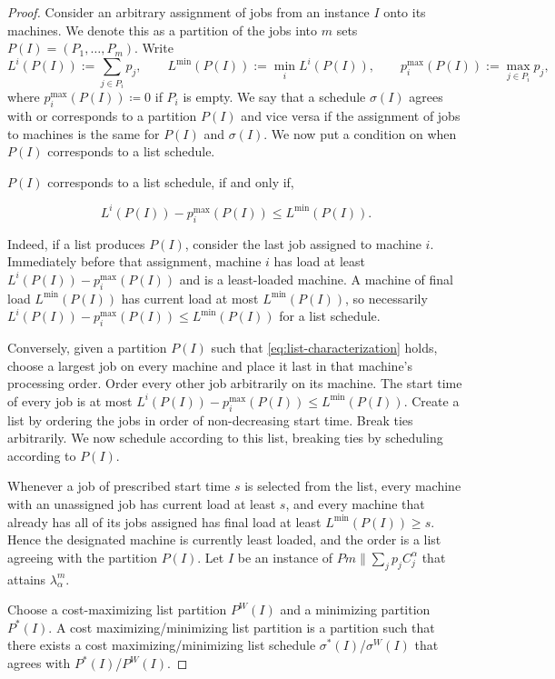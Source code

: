 \documentclass[%
english, titlepage=false %
]{./tum-templates/book/tumbook}
\begin{document}
\begin{proof}
Consider an arbitrary assignment of jobs from an instance $I$ onto its machines. We denote this as a partition of the jobs into $m$
sets $P(I)=(P_1,\ldots,P_m)$.
Write
\[
    L^{i}(P(I)):=\sum_{j\in P_i}p_j,
 \qquad L^{\min}(P(I)):=\min_i L^i(P(I)),
 \qquad p^{\max}_i(P(I)):=\max_{j\in P_i}p_j,
\]
where $p^{\max}_i(P(I)) \coloneqq 0$ if $P_i$ is empty. 
We say that a schedule $\sigma(I)$ agrees with or corresponds to a partition $P(I)$ and vice versa if the assignment of jobs to machines is the same for $P(I)$ and $\sigma(I)$.
We now put a condition on when $P(I)$ corresponds to a list schedule.

$P(I)$ corresponds to a list schedule, if and only if, 

\begin{equation}
    L^{i}(P(I))-p^{\max}_i(P(I)) \le L^{\min}(P(I)).
    \label{eq:list-characterization}
\end{equation}


Indeed, if a list produces $P(I)$, consider the last job assigned to
machine $i$.  Immediately before that assignment, machine $i$ has load
at least $L^{i}(P(I))-p^{\max}_i(P(I))$ and is a least-loaded machine.  A machine of final
load $L^{\min}(P(I))$ has current load at most $L^{\min}(P(I))$, so necessarily $L^{i}(P(I))-p^{\max}_i(P(I)) \le L^{\min}(P(I))$ for
a list schedule.

Conversely, given a partition $P(I)$ such that \eqref{eq:list-characterization} holds,
choose a largest job on every machine and place it last in that
machine's processing order. Order every other job arbitrarily on its
machine. 
The start time of every job is at most
$L^i(P(I))-p^{\max}_i(P(I))\leq L^{\min}(P(I))$. Create a list by ordering the jobs in order
of non-decreasing start time. Break ties arbitrarily. We now schedule according to this list, 
breaking ties by scheduling according to $P(I)$.\medskip 

Whenever a job of prescribed start time $s$ is selected from the list,
every machine with an unassigned job has current load at least $s$, and
every machine that already has all of its jobs assigned has final load at least $ L^{\min}(P(I))\geq s$.  Hence the
designated machine is currently least loaded, and the order is a
list agreeing with the partition $P(I)$.
Let $I$ be an instance of $Pm\!\parallel\!\sum_{j}p_j C^{\alpha}_j$ that attains $\lambda_{\alpha}^m$.

\noindent
Choose a cost-maximizing list partition $P^{W}(I)$ and a minimizing
partition $P^*(I)$. A cost maximizing/minimizing list partition is a partition such that 
there exists a cost maximizing/minimizing list schedule $\sigma^*(I)$/$\sigma^{W}(I)$ that agrees with $P^*(I)$/$P^{W}(I)$.\medskip
 

\end{proof}
\end{document}
